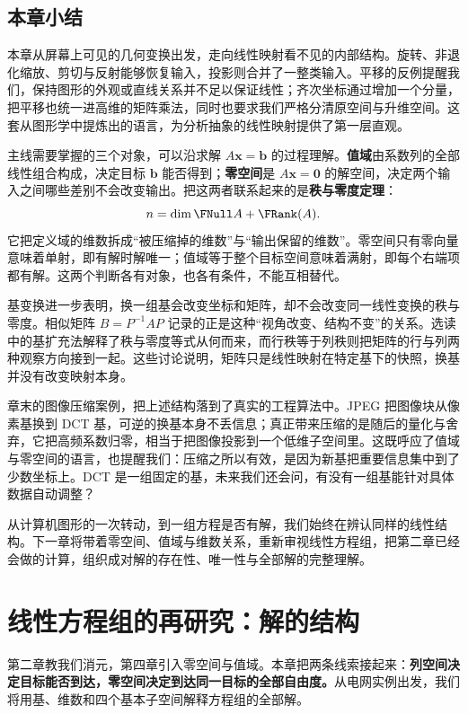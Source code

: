 \documentclass[a4paper,12pt,twoside,openany,fontset=none]{ctexbook}
\numberwithin{equation}{chapter}
\begin{document}
\section*{本章小结}

本章从屏幕上可见的几何变换出发，走向线性映射看不见的内部结构。旋转、非退化缩放、剪切与反射能够恢复输入，投影则合并了一整类输入。平移的反例提醒我们，保持图形的外观或直线关系并不足以保证线性；齐次坐标通过增加一个分量，把平移也统一进高维的矩阵乘法，同时也要求我们严格分清原空间与升维空间。这套从图形学中提炼出的语言，为分析抽象的线性映射提供了第一层直观。

主线需要掌握的三个对象，可以沿求解 $A\boldsymbol{x}=\boldsymbol{b}$ 的过程理解。\textbf{值域}由系数列的全部线性组合构成，决定目标 $\boldsymbol{b}$ 能否得到；\textbf{零空间}是 $A\boldsymbol{x}=\boldsymbol{0}$ 的解空间，决定两个输入之间哪些差别不会改变输出。把这两者联系起来的是\textbf{秩与零度定理}：
\[
n=\dim\FNull A+\FRank(A).
\]
它把定义域的维数拆成“被压缩掉的维数”与“输出保留的维数”。零空间只有零向量意味着单射，即有解时解唯一；值域等于整个目标空间意味着满射，即每个右端项都有解。这两个判断各有对象，也各有条件，不能互相替代。

基变换进一步表明，换一组基会改变坐标和矩阵，却不会改变同一线性变换的秩与零度。相似矩阵 $B=P^{-1}AP$ 记录的正是这种“视角改变、结构不变”的关系。选读中的基扩充法解释了秩与零度等式从何而来，而行秩等于列秩则把矩阵的行与列两种观察方向接到一起。这些讨论说明，矩阵只是线性映射在特定基下的快照，换基并没有改变映射本身。

章末的图像压缩案例，把上述结构落到了真实的工程算法中。JPEG 把图像块从像素基换到 DCT 基，可逆的换基本身不丢信息；真正带来压缩的是随后的量化与舍弃，它把高频系数归零，相当于把图像投影到一个低维子空间里。这既呼应了值域与零空间的语言，也提醒我们：压缩之所以有效，是因为新基把重要信息集中到了少数坐标上。DCT 是一组固定的基，未来我们还会问，有没有一组基能针对具体数据自动调整？

从计算机图形的一次转动，到一组方程是否有解，我们始终在辨认同样的线性结构。下一章将带着零空间、值域与维数关系，重新审视线性方程组，把第二章已经会做的计算，组织成对解的存在性、唯一性与全部解的完整理解。
\par\clearpage
\endgroup
\chapter{线性方程组的再研究：解的结构}
\label{chap:solution-structure}
第二章教我们消元，第四章引入零空间与值域。本章把两条线索接起来：\textbf{列空间决定目标能否到达，零空间决定到达同一目标的全部自由度。}从电网实例出发，我们将用基、维数和四个基本子空间解释方程组的全部解。
\end{document}
